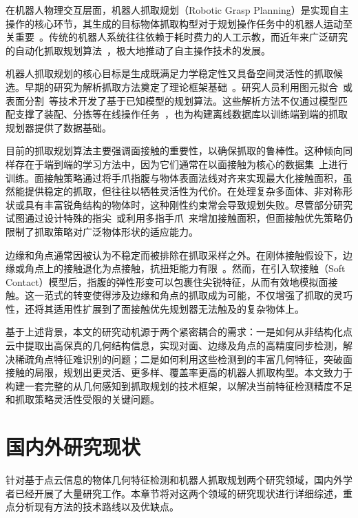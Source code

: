 在机器人物理交互层面，机器人抓取规划（Robotic Grasp Planning）是实现自主操作的核心环节，其生成的目标物体抓取构型对于规划操作任务中的机器人运动至关重要~\cite{li_survey_2019}。传统的机器人系统往往依赖于耗时费力的人工示教，而近年来广泛研究的自动化抓取规划算法~\cite{newbury_deep_2023}，极大地推动了自主操作技术的发展。

机器人抓取规划的核心目标是生成既满足力学稳定性又具备空间灵活性的抓取候选。早期的研究为解析抓取方法奠定了理论框架基础~\cite{asada_studies_1979}。研究人员利用图元拟合~\cite{miller_automatic_2003, goldfeder_grasp_2007}或表面分割~\cite{harada_grasp_2011, wan_planning_2021}等技术开发了基于已知模型的规划算法。这些解析方法不仅通过模型匹配支撑了装配、分拣等在线操作任务~\cite{chen_category_2022}，也为构建离线数据库以训练端到端的抓取规划器提供了数据基础。

目前的抓取规划算法主要强调面接触的重要性，以确保抓取的鲁棒性。这种倾向同样存在于端到端的学习方法中，因为它们通常在以面接触为核心的数据集~\cite{mahler_dexnet_2017, lenz_deep_2015}上进行训练。面接触策略通过将手爪指腹与物体表面法线对齐来实现最大化接触面积，虽然能提供稳定的抓取，但往往以牺牲灵活性为代价。在处理复杂多面体、非对称形状或具有丰富锐角结构的物体时，这种刚性约束常会导致规划失败。尽管部分研究试图通过设计特殊的指尖~\cite{song_fingertip_2018, ringwald_towards_2023}或利用多指手爪~\cite{grady_contactopt_2021}来增加接触面积，但面接触优先策略仍限制了抓取策略对广泛物体形状的适应能力。

边缘和角点通常因被认为不稳定而被排除在抓取采样之外。在刚体接触假设下，边缘或角点上的接触退化为点接触，抗扭矩能力有限~\cite{bicchi_robotic_2000}。然而，在引入软接触（Soft Contact）模型后，指腹的弹性形变可以包裹住尖锐特征，从而有效地模拟面接触。这一范式的转变使得涉及边缘和角点的抓取成为可能，不仅增强了抓取的灵巧性，还将其适用性扩展到了面接触优先规划器无法触及的复杂物体上。

基于上述背景，本文的研究动机源于两个紧密耦合的需求：一是如何从非结构化点云中提取出高保真的几何结构信息，实现对面、边缘及角点的高精度同步检测，解决稀疏角点特征难识别的问题；二是如何利用这些检测到的丰富几何特征，突破面接触的局限，规划出更灵活、更多样、覆盖率更高的机器人抓取构型。本文致力于构建一套完整的从几何感知到抓取规划的技术框架，以解决当前特征检测精度不足和抓取策略灵活性受限的关键问题。


\section{国内外研究现状}
\label{sec:related_work}
针对基于点云信息的物体几何特征检测和机器人抓取规划两个研究领域，国内外学者已经开展了大量研究工作。本章节将对这两个领域的研究现状进行详细综述，重点分析现有方法的技术路线以及优缺点。
